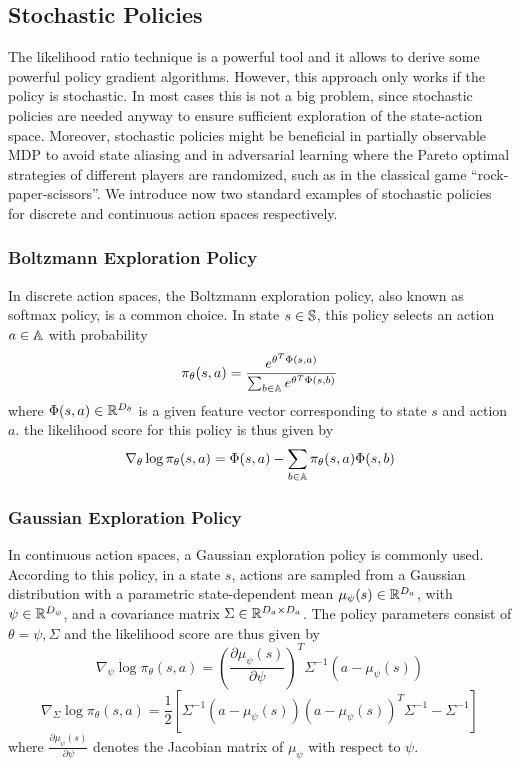 \subsection{Stochastic Policies}
The likelihood ratio technique is a powerful tool and it allows to derive some powerful policy gradient algorithms. However, this approach only works if the policy is  stochastic. In most cases this is not a big problem, since stochastic policies are needed anyway to ensure sufficient exploration of the state-action space. Moreover, stochastic policies might be beneficial in partially observable MDP to avoid state aliasing and in adversarial learning where the Pareto optimal strategies of different players are randomized, such as in the classical game ``rock-paper-scissors''. We introduce now two standard examples of stochastic policies for discrete and continuous action spaces respectively.  

\subsubsection{Boltzmann Exploration Policy}
In discrete action spaces, the Boltzmann exploration policy, also known as softmax policy, is a common choice. In state $s \in \S$, this policy selects an action $a \in \A$ with probability 
\begin{equation}
	\pi_\theta(s,a) = \frac{e^{\theta^T \Phi(s,a)}}{\sum_{b \in \A} e^{\theta^T \Phi(s,b)}}
\end{equation}    
where $\Phi(s,a) \in \R^{D_\theta}$ is a given feature vector corresponding to state $s$ and action $a$. the likelihood score for this policy is thus given by 
\begin{equation}
\nabla_\theta \log \pi_\theta(s,a) = \Phi(s,a) - \sum_{b\in\A} \pi_\theta(s,a) \Phi(s,b)
\end{equation}

\subsubsection{Gaussian Exploration Policy} 
In continuous action spaces, a Gaussian exploration policy is commonly used. According to this policy, in a state $s$, actions are sampled from a Gaussian distribution with a parametric state-dependent mean $\mu_\psi(s) \in \R^{D_a}$, with $\psi \in \R^{D_\psi}$, and a covariance matrix $\Sigma \in \R^{D_a \times D_a}$. The policy parameters consist of $\theta = {\psi, \Sigma}$ and the likelihood score are thus given by 
\begin{equation}
	\nabla_\psi \log \pi_\theta(s,a) = \left(\frac{\partial \mu_\psi(s)}{\partial \psi}\right)^T \Sigma^{-1} (a - \mu_\psi(s))
\end{equation}
\begin{equation}
	\nabla_\Sigma \log \pi_\theta(s,a) = \frac{1}{2}\left[\Sigma^{-1} \left(a - \mu_\psi(s)\right) \left(a - \mu_\psi(s)\right)^T \Sigma^{-1} - \Sigma^{-1}\right]
\end{equation}
where $\frac{\partial \mu_\psi(s)}{\partial \psi}$ denotes the Jacobian matrix of $\mu_\psi$ with respect to $\psi$.

